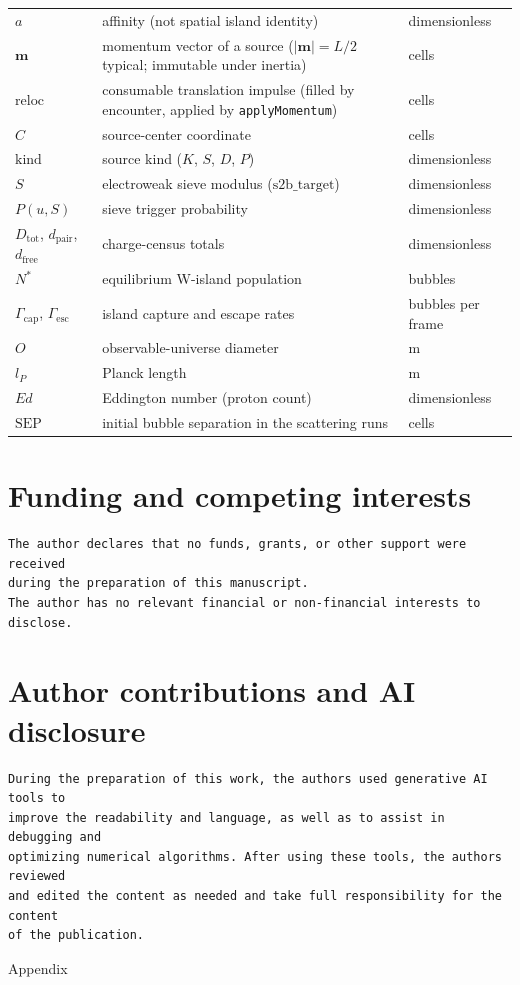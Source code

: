 \documentclass{ijuc}
\begin{document}
\begin{center}
\begin{tabular}{@{}p{2.8cm}p{9.2cm}p{2.8cm}@{}}
$a$ & affinity (not spatial island identity) & dimensionless\\
$\boldsymbol{m}$ & momentum vector of a source ($\lvert\boldsymbol{m}\rvert=L/2$ typical; immutable under inertia) & cells\\
$\mathrm{reloc}$ & consumable translation impulse (filled by encounter, applied by \texttt{applyMomentum}) & cells\\
$C$ & source-center coordinate & cells\\
$\mathrm{kind}$ & source kind ($K$, $S$, $D$, $P$) & dimensionless\\
$S$ & electroweak sieve modulus ($\mathrm{s2b\_target}$) & dimensionless\\
$P(u,S)$ & sieve trigger probability & dimensionless\\
$D_{\mathrm{tot}}$, $d_{\mathrm{pair}}$, $d_{\mathrm{free}}$ & charge-census totals & dimensionless\\
$N^{*}$ & equilibrium W-island population & bubbles\\
$\Gamma_{\mathrm{cap}}$, $\Gamma_{\mathrm{esc}}$ & island capture and escape rates & bubbles per frame\\
$O$ & observable-universe diameter & m\\
$l_{P}$ & Planck length & m\\
$Ed$ & Eddington number (proton count) & dimensionless\\
$\mathrm{SEP}$ & initial bubble separation in the scattering runs & cells\\
\hline
\end{tabular}
\end{center}

\section*{Funding and competing interests}
\begin{verbatim}
The author declares that no funds, grants, or other support were received
during the preparation of this manuscript.
The author has no relevant financial or non-financial interests to disclose.
\end{verbatim}
\section*{Author contributions and AI disclosure}
\begin{verbatim}
During the preparation of this work, the authors used generative AI tools to
improve the readability and language, as well as to assist in debugging and
optimizing numerical algorithms. After using these tools, the authors reviewed
and edited the content as needed and take full responsibility for the content
of the publication.
\end{verbatim}
\printbibliography
\newpage{}
\appendix
\begin{center}
{\LARGE{}Appendix}{\LARGE\par}
\par\end{center}
\end{document}
